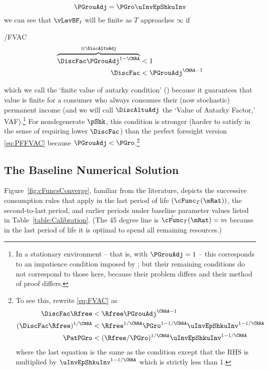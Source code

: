 \documentclass[BufferStockTheory]{subfiles}
\begin{document}
\begin{equation}
  \label{eq:PGrouAdj}
  \PGrouAdj = \PGro \uInvEpShkuInv 
\end{equation}
we can see that $\vLevBF_{t}$ will be finite 
as $T$ approaches $\infty$ if\hypertarget{FVAC}{}
\begin{verbatimwrite}{\EqDir/FVAC}
  \begin{align}
    \overbrace{\DiscFac \PGrouAdj^{1-\CRRA} }^{\equiv \DiscAltuAdj}  & < 1 \notag
    \\ \DiscFac  & < \PGrouAdj^{\CRRA-1} \label{eq:FVAC}
  \end{align}
\end{verbatimwrite}

which we call the `finite value of autarky condition' \hypertarget{FVAC}{}
(\FVAC) because it guarantees that value is finite for a consumer who always consumes their 
(now stochastic) permanent income (and we will call $\DiscAltuAdj$ the `Value of Autarky Factor,' VAF).\footnote{In a stationary environment -- that is, with $\PGrouAdj=1$ -- this corresponds to an impatience condition imposed by \cite{mstIncFluct}; but their remaining conditions do not correspond to those here, because their problem differs and their method of proof differs.}  For nondegenerate $\pShk$, this 
condition is stronger
(harder to satisfy in the sense of requiring lower $\DiscFac$) than
the perfect foresight version \eqref{eq:PFFVAC} because $\PGrouAdj <
\PGro$.\footnote{To see this, rewrite \eqref{eq:FVAC} as 
  \begin{align*}
    \DiscFac \Rfree & < \Rfree \PGrouAdj^{\CRRA-1}
    \\ (\DiscFac \Rfree)^{1/\CRRA}  & < \Rfree^{1/\CRRA} \PGro^{1-1/\CRRA} \uInvEpShkuInv^{1-1/\CRRA} 
    \\ \PatPGro & < (\Rfree/\PGro)^{1/\CRRA} \uInvEpShkuInv^{1-1/\CRRA}
  \end{align*}
  where the last equation is the same as the {\PFFVAC} condition except that the 
  RHS is multiplied by $\uInvEpShkuInv^{1-1/\CRRA}$ which is strictly less than 1.}


\hypertarget{Baseline-Numerical-Solution}{}
\subsection{The Baseline Numerical Solution}

Figure~\ref{fig:cFuncsConverge}, familiar from the literature, depicts the successive consumption
rules that apply in the last period of life $(\cFunc_{T}(\mRat))$, the
second-to-last period, and earlier periods under baseline parameter values listed in Table~\ref{table:Calibration}.  (The 45 degree line is $\mathring{\cFunc}_{T}(\mRat) = m$ because in
the last period of life it is optimal to spend all remaining
resources.)
\end{document}
